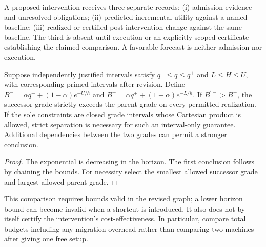 \documentclass[11pt]{article}
\begin{document}
\begin{definition}
A proposed intervention receives three separate records: (i) admission evidence and unresolved obligations; (ii) predicted incremental utility against a named baseline; (iii) realized or certified post-intervention change against the same baseline. The third is absent until execution or an explicitly scoped certificate establishing the claimed comparison. A favorable forecast is neither admission nor execution.
\end{definition}

\begin{proposition}
Suppose independently justified intervals satisfy $q^-\leq q\leq q^+$ and $L\leq H\leq U$, with corresponding primed intervals after revision. Define $B^- =\alpha q^-+(1-\alpha)e^{-U/h}$ and $B^+=\alpha q^++(1-\alpha)e^{-L/h}$. If $B^{\prime-}>B^+$, the successor grade strictly exceeds the parent grade on every permitted realization. If the sole constraints are closed grade intervals whose Cartesian product is allowed, strict separation is necessary for such an interval-only guarantee. Additional dependencies between the two grades can permit a stronger conclusion.
\end{proposition}
\begin{proof}The exponential is decreasing in the horizon. The first conclusion follows by chaining the bounds. For necessity select the smallest allowed successor grade and largest allowed parent grade.\end{proof}
This comparison requires bounds valid in the revised graph; a lower horizon bound can become invalid when a shortcut is introduced. It also does not by itself certify the intervention's cost-effectiveness. In particular, compare total budgets including any migration overhead rather than comparing two machines after giving one free setup.
\end{document}
